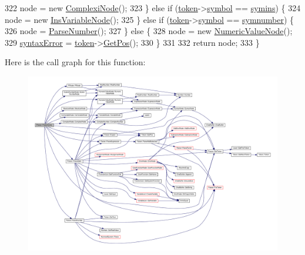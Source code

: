 \begin{DoxyCode}
322         node = \textcolor{keyword}{new} \hyperlink{classComplexiNode}{ComplexiNode}();
323     \} \textcolor{keywordflow}{else} \textcolor{keywordflow}{if} (\hyperlink{classParser_a467028559d31c5b33f16ca8be56715cc}{token}->\hyperlink{structToken_aa671eaaae5632c5277e89a090d864820}{symbol} == \hyperlink{lex_8h_a7feef761cd73fac6e25b8bb80d2c4e54a9d73d7f91bede76e486cd94f75675faf}{symins}) \{
324         node = \textcolor{keyword}{new} \hyperlink{classInsVariableNode}{InsVariableNode}();
325     \} \textcolor{keywordflow}{else} \textcolor{keywordflow}{if} (\hyperlink{classParser_a467028559d31c5b33f16ca8be56715cc}{token}->\hyperlink{structToken_aa671eaaae5632c5277e89a090d864820}{symbol} == \hyperlink{lex_8h_a7feef761cd73fac6e25b8bb80d2c4e54add691c5ad44197e2c9e9dab9793450a2}{symnumber}) \{
326         node = \hyperlink{classParser_a769d580b14d3d097ed255ad869cc1653}{ParseNumber}();
327     \} \textcolor{keywordflow}{else} \{
328         node = \textcolor{keyword}{new} \hyperlink{classNumericValueNode}{NumericValueNode}();
329         \hyperlink{classParser_ae50a199b804c9f5e8342a4d0a1ae6a95}{syntaxError} = \hyperlink{classParser_a467028559d31c5b33f16ca8be56715cc}{token}->\hyperlink{structToken_a5f93ea94940a6eeb060507e1da594599}{GetPos}();
330     \}
331 
332     \textcolor{keywordflow}{return} node;
333 \}
\end{DoxyCode}


Here is the call graph for this function\+:
\nopagebreak
\begin{figure}[H]
\begin{center}
\leavevmode
\includegraphics[width=350pt]{d0/d40/classParser_ac1a69267c9414b54a4b592c9ad084780_cgraph}
\end{center}
\end{figure}




